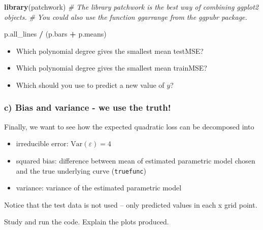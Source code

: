 \documentclass[
]{article}
\newenvironment{Shaded}{\begin{snugshade}}{\end{snugshade}}
\newcommand{\CommentTok}[1]{\textcolor[rgb]{0.56,0.35,0.01}{\textit{#1}}}
\newcommand{\FunctionTok}[1]{\textcolor[rgb]{0.13,0.29,0.53}{\textbf{#1}}}
\newcommand{\NormalTok}[1]{#1}
\newcommand{\SpecialCharTok}[1]{\textcolor[rgb]{0.81,0.36,0.00}{\textbf{#1}}}
\providecommand{\tightlist}{%
  \setlength{\itemsep}{0pt}\setlength{\parskip}{0pt}}
\begin{document}
\begin{Shaded}
\begin{Highlighting}[]
\FunctionTok{library}\NormalTok{(patchwork) }\CommentTok{\# The library patchwork is the best way of combining ggplot2 objects. }
\CommentTok{\# You could also use the function ggarrange from the ggpubr package.}

\NormalTok{p.all\_lines }\SpecialCharTok{/}\NormalTok{ (p.bars }\SpecialCharTok{+}\NormalTok{ p.means)}
\end{Highlighting}
\end{Shaded}

\begin{itemize}
\tightlist
\item
  Which polynomial degree gives the smallest mean testMSE?
\item
  Which polynomial degree gives the smallest mean trainMSE?
\item
  Which should you use to predict a new value of \(y\)?
\end{itemize}

\subsubsection{c) Bias and variance - we use the
truth!}\label{c-bias-and-variance---we-use-the-truth}

Finally, we want to see how the expected quadratic loss can be
decomposed into

\begin{itemize}
\tightlist
\item
  irreducible error: \(\text{Var}(\varepsilon)=4\)
\item
  squared bias: difference between mean of estimated parametric model
  chosen and the true underlying curve (\texttt{truefunc})
\item
  variance: variance of the estimated parametric model
\end{itemize}

Notice that the test data is not used -- only predicted values in each x
grid point.

Study and run the code. Explain the plots produced.
\end{document}
